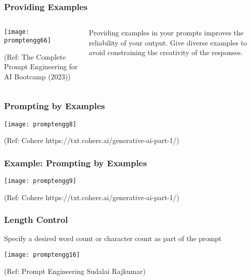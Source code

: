 \begin{frame}[fragile]\frametitle{Providing Examples}

\begin{columns}
    \begin{column}[T]{0.6\linewidth}
		\begin{center}
		\texttt{[image: promptengg66]}

		{\tiny (Ref: The Complete Prompt Engineering for AI Bootcamp (2023))}
		\end{center}	
    \end{column}
    \begin{column}[T]{0.4\linewidth}
		Providing examples in your prompts improves the reliability of your output.
		Give diverse examples to avoid constraining the creativity of the responses.
    \end{column}
  \end{columns}
\end{frame}


\begin{frame}[fragile]\frametitle{Prompting by Examples}

\begin{center}
\texttt{[image: promptengg8]}

{\tiny (Ref: Cohere https://txt.cohere.ai/generative-ai-part-1/)}

\end{center}		
		


\end{frame}

\begin{frame}[fragile]\frametitle{Example: Prompting by Examples}

\begin{center}
\texttt{[image: promptengg9]}

{\tiny (Ref: Cohere https://txt.cohere.ai/generative-ai-part-1/)}

\end{center}		
		
\end{frame}



\begin{frame}[fragile]\frametitle{Length Control}

Specify a desired word count or character count as part of the prompt

\begin{center}
\texttt{[image: promptengg16]}

{\tiny (Ref: Prompt Engineering Sudalai Rajkumar)}

\end{center}		

\end{frame}

